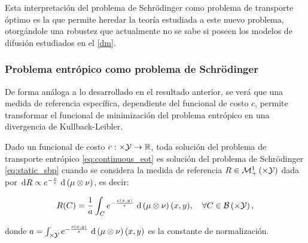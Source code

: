 Esta interpretación del problema de Schrödinger como problema de transporte óptimo es la que permite heredar la teoría estudiada a este nuevo problema, otorgándole una robustez que actualmente no se sabe si poseen los modelos de difusión estudiados en el \autoref{dm}.

\subsubsection{Problema entrópico como problema de Schrödinger}

De forma análoga a lo desarrollado en el resultado anterior, se verá que una medida de referencia específica, dependiente del funcional de costo $c$, permite transformar el funcional de minimización del problema entrópico en una divergencia de Kullback-Leibler.

\begin{prop}
	\label{prop:eot_as_sbp}
	Dado un funcional de costo $c:\times\mathcal{Y}\to\mathbb{R}$, toda solución del problema de transporte entrópico \eqref{eq:continuous_eot} es solución del problema de Schrödinger \eqref{eq:static_sbp} cuando se considera la medida de referencia $R\in\probmeasure{\xspace\times\yspace}$ dada por $\,\operatorname{d}\! R \propto e^{-\frac{c}{\epsilon}}\,\operatorname{d}\!\,\left(\mu\otimes\nu\right)$, es decir:

	\begin{equation*}
		R(C)=\frac{1}{a}\int_C e^{-\frac{c(x,y)}{\epsilon}}\d\,\parent{\mu\otimes\nu}(x,y),
		\quad \forall C\in\borel{\xspace\times\yspace},
	\end{equation*}

	donde $a = \int_{\times\mathcal{Y}} e^{-\frac{c(x,y)}{\epsilon}}\,\operatorname{d}\!\,\left(\mu\otimes\nu\right)(x,y)$ es la constante de normalización.

\end{prop}

